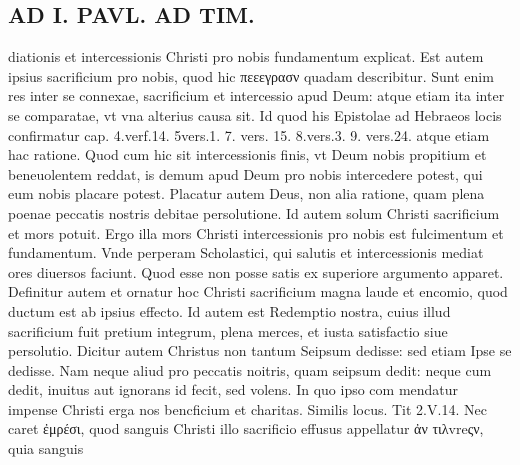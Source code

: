 \documentclass{article}
\begin{document}
\begin{pages}
\section*{AD I. PAVL. AD TIM. }
\marginpar{[ p.oo ]}\pstart diationis et intercessionis Christi pro nobis fundamentum explicat. Est autem ipsius sacrificium pro nobis, quod hic πεεεγρασν quadam describitur. Sunt enim res inter se connexae, sacrificium et intercessio apud Deum: atque etiam ita inter se comparatae, vt vna alterius causa sit. Id quod his Epistolae ad Hebraeos locis confirmatur cap. 4.verf.14. 5vers.1. 7. vers. 15. 8.vers.3. 9. vers.24. atque etiam hac ratione. Quod cum hic sit intercessionis finis, vt Deum nobis propitium et beneuolentem reddat, is demum apud Deum pro nobis intercedere potest, qui eum nobis placare potest. Placatur autem Deus, non alia ratione, quam plena poenae peccatis nostris debitae persolutione. Id autem solum Christi sacrificium et mors potuit. Ergo illa mors Christi intercessionis pro nobis est fulcimentum et fundamentum. Vnde perperam Scholastici, qui salutis et intercessionis mediat ores diuersos faciunt. Quod esse non posse satis ex superiore argumento apparet. Definitur autem et ornatur hoc Christi sacrificium magna laude et encomio, quod ductum est ab ipsius effecto. Id autem est Redemptio nostra, cuius illud sacrificium fuit pretium integrum, plena merces, et iusta satisfactio siue persolutio. Dicitur autem Christus non tantum Seipsum dedisse: sed etiam Ipse se dedisse. Nam neque aliud pro peccatis noitris, quam seipsum dedit: neque cum dedit, inuitus aut ignorans id fecit, sed volens. In quo ipso com mendatur impense Christi erga nos bencficium et charitas. Similis locus. Tit 2.V.14. Nec caret ἐμρέσι, quod sanguis Christi illo sacrificio effusus appellatur ἀν τιλvreςν, quia sanguis  \pend

\end{pages}
\end{document}
